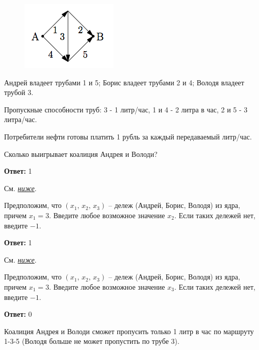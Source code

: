 	\begin{figure}
		\centering
		\includegraphics[width=\linewidth]{week6-control-1}
		\caption{}
		\label{fig:week6-control-1}
	\end{figure}

	Андрей владеет трубами 1 и 5; Борис владеет трубами 2 и 4; Володя владеет трубой 3.
	
	Пропускные способности труб: 3 - 1 литр/час, 1 и 4 - 2 литра в час, 2 и 5 - 3 литра/час.
	
	Потребители нефти готовы платить 1 рубль за каждый передаваемый литр/час.
	
	Сколько выигрывает коалиция Андрея и Володи?
	
	\textbf{Ответ:} 1

	\solution См. \hyperref[control:sol7]{\textit{ниже}}.
	
	\task
	Предположим, что $(x_1,\,x_2,\,x_3)$ -- дележ (Андрей, Борис, Володя) из ядра, причем $x_1=3$. Введите любое возможное значение $x_2$. Если таких дележей нет, введите $-1$.
	
	\textbf{Ответ:} 1
	
		\solution См. \hyperref[control:sol7]{\textit{ниже}}.
	
	\task
	
	Предположим, что $(x_1,\,x_2,\,x_3)$ -- дележ (Андрей, Борис, Володя) из ядра, причем $x_1=3$. Введите любое возможное значение $x_3$. Если таких дележей нет, введите $-1$.
	
	\textbf{Ответ:} 0
	
	\solution
	\label{control:sol7}
	
	Коалиция Андрея и Володи сможет пропусить только 1 литр в час по маршруту 1-3-5 (Володя больше не может пропустить по трубе 3).
	
